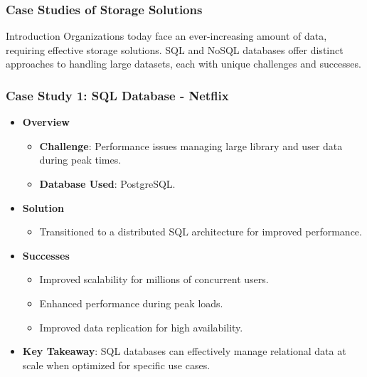 \documentclass[aspectratio=169]{beamer}
\begin{document}
\begin{frame}
    \frametitle{Case Studies of Storage Solutions}
    \begin{block}{Introduction}
        Organizations today face an ever-increasing amount of data, requiring effective storage solutions. SQL and NoSQL databases offer distinct approaches to handling large datasets, each with unique challenges and successes.
    \end{block}
\end{frame}

\begin{frame}[fragile]
    \frametitle{Case Study 1: SQL Database - Netflix}
    \begin{itemize}
        \item \textbf{Overview}
            \begin{itemize}
                \item \textbf{Challenge}: Performance issues managing large library and user data during peak times.
                \item \textbf{Database Used}: PostgreSQL.
            \end{itemize}
        \item \textbf{Solution}
            \begin{itemize}
                \item Transitioned to a distributed SQL architecture for improved performance.
            \end{itemize}
        \item \textbf{Successes}
            \begin{itemize}
                \item Improved scalability for millions of concurrent users.
                \item Enhanced performance during peak loads.
                \item Improved data replication for high availability.
            \end{itemize}
        \item \textbf{Key Takeaway}: SQL databases can effectively manage relational data at scale when optimized for specific use cases.
    \end{itemize}
\end{frame}
\end{document}
